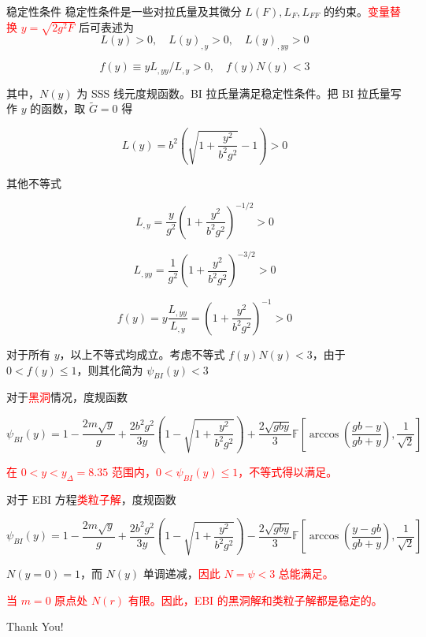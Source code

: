 \documentclass[9pt, dvipsnames]{beamer} %
\begin{document}
\begin{frame}{稳定性条件}
    稳定性条件是一些对拉氏量及其微分 $L(F),L_F,L_{FF}$ 的约束。\textcolor{red}{变量替换 $y=\sqrt{2g^2 F}$} 后可表述为
    $$
    L(y)>0,\quad
    L(y)_{,y}>0,\quad
    L(y)_{,yy}>0 
    $$

    $$
    f(y)
    \equiv yL_{,yy} / L_{,y} > 0,\quad
    f(y) N(y) < 3    
    $$

    其中，$N(y)$ 为 SSS 线元度规函数。BI 拉氏量满足稳定性条件。把 BI 拉氏量写作 $y$ 的函数，取 $\tilde{G}=0$ 得

    $$
    L(y)
    =b^2\left(\sqrt{1+\frac{y^2 }{b^2 g^2 } } - 1 \right) > 0 
    $$

    其他不等式
    
    $$
    L_{,y} = \frac{y }{g^2 } \left(1 + \frac{y^2 }{b^2 g^2 }  \right)^{-1/2} > 0
    $$

    $$
    L_{,yy} = \frac{1 }{g^2 } \left(1 + \frac{y^2 }{b^2 g^2 }  \right)^{-3/2} > 0
    $$

    $$
    f(y) = y\frac{L_{,yy} }{L_{,y} } = \left(1 + \frac{y^2 }{b^2 g^2 }  \right)^{-1} > 0
    $$

\end{frame}

\begin{frame}
    对于所有 $y$，以上不等式均成立。考虑不等式 $f(y)N(y)<3$，由于 $0<f(y)\leqslant 1$，则其化简为 $\psi_{BI}(y)<3$

    对于\textcolor{red}{黑洞}情况，度规函数

    $$
    \psi_{BI}(y)
    =1-\frac{2m\sqrt{y} }{g } + \frac{2b^2 g^2 }{3y } \left(1-\sqrt{1+\frac{y^2 }{b^2 g^2 } } \right) + \frac{2\sqrt{gby} }{3 } \mathbb{F}\left[\arccos\left(\frac{gb-y }{gb+y } \right), \frac{1 }{\sqrt{2} }   \right] 
    $$

    \textcolor{red}{在 $0<y<y_\Delta=8.35$ 范围内，$0<\psi_{BI}(y)\leqslant 1$，不等式得以满足。}

    对于 EBI 方程\textcolor{red}{类粒子解}，度规函数

    $$
    \psi_{BI}(y)
    =1-\frac{2m\sqrt{y} }{g } + \frac{2b^2 g^2 }{3y } \left(1-\sqrt{1+\frac{y^2 }{b^2 g^2 } } \right) - \frac{2\sqrt{gby} }{3 } \mathbb{F}\left[\arccos\left(\frac{y-gb }{gb+y } \right), \frac{1 }{\sqrt{2} } \right]
    $$

    $N(y=0)=1$，而 $N(y)$ 单调递减，\textcolor{red}{因此 $N=\psi<3$ 总能满足。}

    \textcolor{red}{当 $m=0$ 原点处 $N(r)$ 有限。因此，EBI 的黑洞解和类粒子解都是稳定的。}

\end{frame}
    
\begin{frame}[noframenumbering]
    \centering
    {\fontsize{40}{50}\selectfont Thank You!}
\end{frame}
\end{document}

